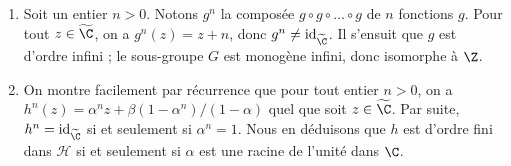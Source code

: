 \begin{enumerate}
  \item
    Soit un entier $n > 0$.
    Notons $g^n$ la composée $g \circ g \circ \dots \circ g$ de $n$ fonctions $g$.
    Pour tout $z\in\widetilde{\C}$, on a $g^n(z) = z + n$, donc $g^n \neq \mathrm{id}_{\widetilde{\C}}$.
    Il s'ensuit que $g$ est d'ordre infini ; le sous-groupe $G$ est monogène infini, donc isomorphe à $\Z$.
  \item
    On montre facilement par récurrence que pour tout entier $n > 0$, on a $h^n(z) = \alpha^n z + \beta(1 - \alpha^n)/(1 - \alpha)$ quel que soit $z\in\widetilde{\C}$.
    Par suite, $h^n = \mathrm{id}_{\widetilde{\C}}$ si et seulement si $\alpha^n = 1$.
    Nous en déduisons que $h$ est d'ordre fini dans $\mathcal{H}$ si et seulement si $\alpha$ est une racine de l'unité dans $\C$.
\end{enumerate}

